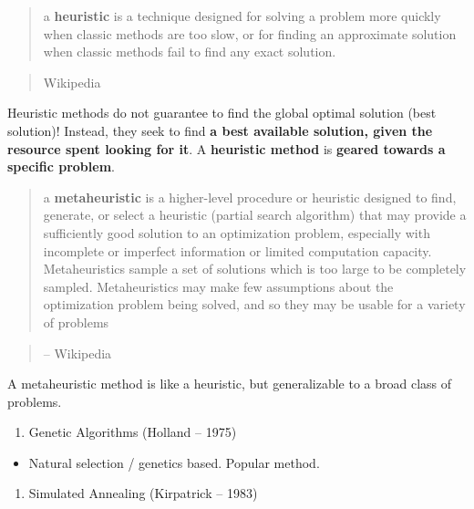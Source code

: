 \documentclass[fontset=fandol,zihao=false,scheme=chinese,heading=true,UTF8]{ctexbook}
\providecommand{\tightlist}{%
  \setlength{\itemsep}{0pt}\setlength{\parskip}{0pt}}
\begin{document}
\begin{quote}
a \textbf{heuristic} is a technique designed for solving a problem more quickly when classic methods are too slow, or for finding an approximate solution when classic methods fail to find any exact solution.
\end{quote}

\begin{quote}
Wikipedia
\end{quote}

Heuristic methods do not guarantee to find the global optimal solution (best solution)!
Instead, they seek to find \textbf{a best available solution, given the resource spent looking for it}.
A \textbf{heuristic method} is \textbf{geared towards a specific problem}.

\begin{quote}
a \textbf{metaheuristic} is a higher-level procedure or heuristic designed to find, generate, or select a heuristic (partial search algorithm) that may provide a sufficiently good solution to an optimization problem, especially with incomplete or imperfect information or limited computation capacity. Metaheuristics sample a set of solutions which is too large to be completely sampled. Metaheuristics may make few assumptions about the optimization problem being solved, and so they may be usable for a variety of problems
\end{quote}

\begin{quote}
-- Wikipedia
\end{quote}

A metaheuristic method is like a heuristic, but generalizable to a broad class of problems.

\begin{enumerate}
\def\labelenumi{\arabic{enumi}.}
\tightlist
\item
  Genetic Algorithms (Holland -- 1975)
\end{enumerate}

\begin{itemize}
\tightlist
\item
  Natural selection / genetics based. Popular method.
\end{itemize}

\begin{enumerate}
\def\labelenumi{\arabic{enumi}.}
\setcounter{enumi}{1}
\tightlist
\item
  Simulated Annealing (Kirpatrick -- 1983)
\end{enumerate}
\end{document}
